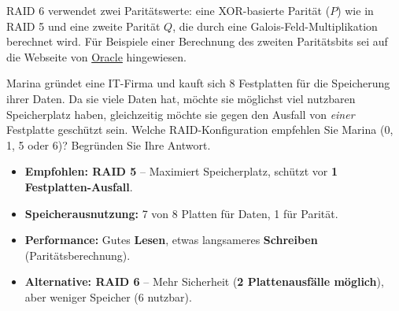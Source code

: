 RAID 6 verwendet zwei Paritätswerte: eine XOR-basierte Parität (\(P\)) wie in RAID 5 und eine zweite Parität \(Q\), die durch eine Galois-Feld-Multiplikation berechnet wird. Für Beispiele einer Berechnung des zweiten Paritätsbits sei auf die Webseite von \href{https://blogs.oracle.com/solaris/post/understanding-raid-6-with-junior-high-math}{Oracle} hingewiesen.

\begin{myexercise}
	Marina gründet eine IT-Firma und kauft sich 8 Festplatten für die Speicherung ihrer Daten. Da sie viele Daten hat, möchte sie möglichst viel nutzbaren Speicherplatz haben, gleichzeitig möchte sie gegen den Ausfall von \textit{einer} Festplatte geschützt sein. Welche RAID-Konfiguration empfehlen Sie Marina (0, 1, 5 oder 6)? Begründen Sie Ihre Antwort.
	\begin{myanswer}
		\begin{itemize}
			\item \textbf{Empfohlen: RAID 5} -- Maximiert Speicherplatz, schützt vor \textbf{1 Festplatten-Ausfall}.
			\item \textbf{Speicherausnutzung:} 7 von 8 Platten für Daten, 1 für Parität.
			\item \textbf{Performance:} Gutes \textbf{Lesen}, etwas langsameres \textbf{Schreiben} (Paritätsberechnung).
			\item \textbf{Alternative: RAID 6} -- Mehr Sicherheit (\textbf{2 Plattenausfälle möglich}), aber weniger Speicher (6 nutzbar).
		\end{itemize}
	\end{myanswer}


\end{myexercise}

